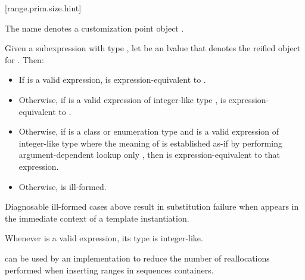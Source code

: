 \documentclass{wg21}
\begin{document}
\begin{addedblock}
[range.prim.size.hint]{}
%

\pnum
The name  denotes a customization point
object .

\pnum
Given a subexpression  with type ,
let  be an lvalue that denotes the reified object for .
Then:

\begin{itemize}
    \item
    If  is a valid expression,  is expression-equivalent to
    .

    \item
    Otherwise, if 
    is a valid expression of integer-like type ,
     is expression-equivalent to
    .

    \item
    Otherwise, if  is a class or enumeration type and 
    is a valid expression of integer-like type
    where the meaning of  is established as-if by performing
    argument-dependent lookup only ,
    then  is expression-equivalent to
    that expression.

    \item
    Otherwise,  is ill-formed.
\end{itemize}

\pnum
\begin{note}
Diagnosable ill-formed cases above
result in substitution failure when 
appears in the immediate context of a template instantiation.
\end{note}

\pnum
\begin{note}
    Whenever  is a valid expression, its
    type is integer-like.
\end{note}

\recommended

 can be used by an implementation to reduce the number of reallocations performed
when inserting ranges in sequences containers.

\end{addedblock}
\end{document}
